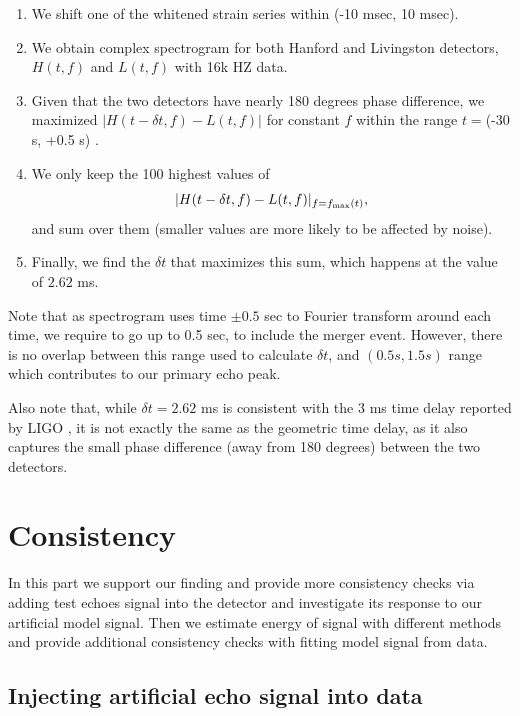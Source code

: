 \documentclass[12pt]{article}
\begin{document}
\begin{enumerate}
\item      We shift one of the whitened strain series within (-10 msec, 10 msec).
\item      We obtain complex spectrogram for both Hanford and Livingston detectors, $H(t,f)$ and $L(t,f)$ with 16k HZ data.
\item      Given that the two detectors have nearly 180 degrees phase difference, we maximized $|H(t-\delta t,f)-L(t,f)|$ for constant $f$ within the range $t=$(-30 s, +0.5 s) . \item     We only keep the 100 highest values of $$|H(t-\delta t,f)-L(t,f)|_{f=f_{\rm max}(t)},$$ and sum over them (smaller values are more likely to be affected by noise).
\item      Finally, we find the $\delta t$ that maximizes this sum, which happens at the value of $2.62$ ms. 
\end{enumerate}

Note that as spectrogram uses time $\pm 0.5$ sec to Fourier transform around each time, we require to go up to 0.5 sec, to include the merger event. However, there is no overlap between this range used to calculate $\delta t$, and $(0.5 s, 1.5 s)$ range which contributes to our primary echo peak.  

Also note that, while $\delta t = 2.62 $ ms is consistent with the 3 ms time delay reported by LIGO \cite{TheLIGOScientific:2017qsa}, it is not exactly the same as the geometric time delay, as it also captures the small phase difference (away from 180 degrees) between the two detectors.   


\section{Consistency\label{Consistency}}

In this part we support our finding and provide more consistency checks via adding test echoes signal into the detector and investigate its response to our artificial model signal. Then we estimate energy of signal with different methods and provide additional consistency checks with fitting model signal from data. 

\subsection{Injecting artificial echo signal into data}
\end{document}
